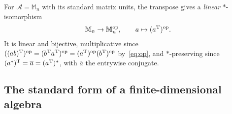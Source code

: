 \documentclass[12pt]{article}
\newcounter{todo}
\newcommand{\todo}[1]{%
  \refstepcounter{todo}%
  \addcontentsline{tdo}{todo}{\protect\numberline{\thetodo}#1}%
  \textcolor{\mysubcolor}{\small\textbf{[TODO~\thetodo:} #1\textbf{]}}}
\newcommand{\alg}{\mathcal{A}}             %
\newcommand{\Mn}[1][n]{\mathbb{M}_{#1}}    %
\newcommand{\op}{^{\mathrm{op}}}           %
\begin{document}
\begin{remark}
For \(\alg = \Mn\) with its standard matrix units, the transpose gives a
\emph{linear} \(*\)-isomorphism
\begin{equation}
\label{eq:transpose-op}
  \Mn \to \Mn\op , \qquad a \mapsto (a^\transpose)\op .
\end{equation}
It is linear and bijective, multiplicative since
\(((ab)^\transpose)\op = (b^\transpose a^\transpose)\op
= (a^\transpose)\op (b^\transpose)\op\) by~\eqref{eq:op}, and \(*\)-preserving
since \((a^*)^{\mathrm T} = \overline{a} = (a^{\mathrm T})^*\), with
\(\overline{a}\) the entrywise conjugate. 
\end{remark}

\subsection{The standard form of a finite-dimensional algebra}
\label{sec:standard-form}
\end{document}
